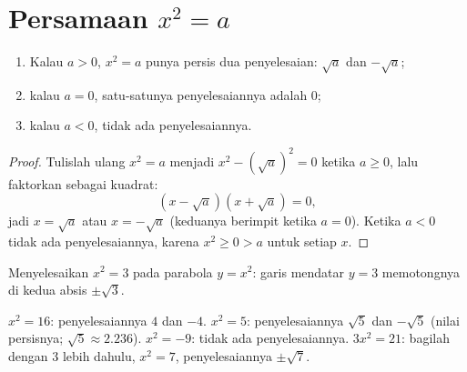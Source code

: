 \section{Persamaan \texorpdfstring{$x^2 = a$}{x2 = a}}

\begin{theorem}[Menyelesaikan $x^2 = a$]\label{thm:g9:sqrt:equation}
\begin{enumerate}
  \item Kalau $a > 0$,  $x^2 = a$ punya persis dua
        penyelesaian: $\sqrt a$ dan $-\sqrt a$;
  \item kalau $a = 0$, satu-satunya penyelesaiannya adalah $0$;
  \item kalau $a < 0$, tidak ada penyelesaiannya.
\end{enumerate}
\end{theorem}

\begin{proof}
Tulislah ulang $x^2 = a$ menjadi $x^2 - \left(\sqrt a\right)^2 = 0$
ketika $a \geq 0$, lalu faktorkan sebagai  kuadrat:
\[
\left(x - \sqrt a\right)\left(x + \sqrt a\right) = 0 ,
\]
jadi $x = \sqrt a$ atau $x = -\sqrt a$ (keduanya berimpit ketika
$a = 0$). Ketika $a < 0$ tidak ada penyelesaiannya, karena
$x^2 \geq 0 > a$ untuk setiap $x$.
\end{proof}

\begin{omfigure}

{\small Menyelesaikan $x^2 = 3$ pada parabola $y = x^2$: garis mendatar
$y = 3$ memotongnya di kedua absis $\pm\sqrt3$.}
\end{omfigure}

\begin{example}
$x^2 = 16$: penyelesaiannya $4$ dan $-4$. \quad
$x^2 = 5$: penyelesaiannya $\sqrt5$ dan $-\sqrt5$ (nilai persisnya;
$\sqrt5 \approx 2.236$). \quad
$x^2 = -9$: tidak ada penyelesaiannya. \quad
$3x^2 = 21$: bagilah dengan 3 lebih dahulu, $x^2 = 7$, penyelesaiannya $\pm\sqrt7$.
\end{example}

